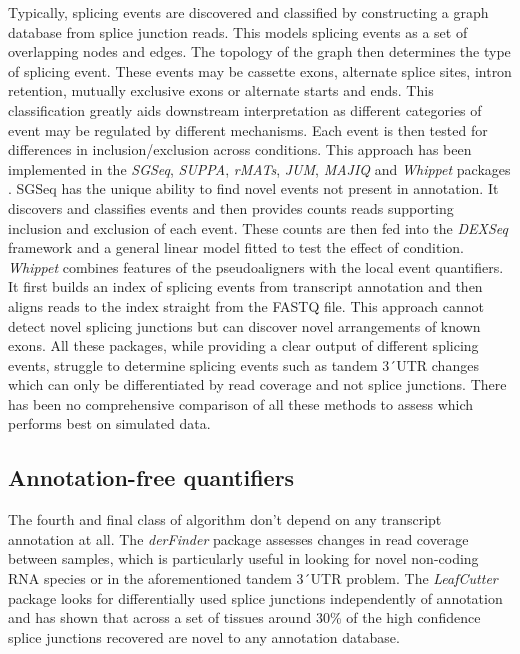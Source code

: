 Typically, splicing events are discovered and classified by constructing a graph database from splice junction reads.
This models splicing events as a set of overlapping nodes and edges. 
The topology of the graph then determines the type of splicing event.
These events may be cassette exons, alternate splice sites, intron retention, mutually exclusive exons or alternate starts and ends. 
This classification greatly aids downstream interpretation as different categories of event may be regulated by different mechanisms.
 Each event is then tested for differences in inclusion/exclusion across conditions. 
 This approach has been implemented in the \textit{SGSeq}, \textit{SUPPA}, \textit{rMATs}, \textit{JUM}, \textit{MAJIQ} and \textit{Whippet} packages \citep{Goldstein2016,Alamancos2015,Vaquero-Garcia2016,Wang2018a,Shen2014, Sterne-Weiler2018a}. 
SGSeq has the unique ability to find novel events not present in annotation. 
It discovers and classifies events and then provides counts reads supporting inclusion and exclusion of each event.
These counts are then fed into the \textit{DEXSeq} framework and a general linear model fitted to test the effect of condition. %
\textit{Whippet} combines features of the pseudoaligners with the local event quantifiers. 
It first builds an index of splicing events from transcript annotation and then aligns reads to the index straight from the FASTQ file. 
This approach cannot detect novel splicing junctions but can discover novel arrangements of known exons.
All these packages, while providing a clear output of different splicing events, struggle to determine splicing events such as tandem 3\'\ UTR changes which can only be differentiated by read coverage and not splice junctions.
There has been no comprehensive comparison of all these methods to assess which performs best on simulated data.

\subsection{Annotation-free quantifiers}
The fourth and final class of algorithm don't depend on any transcript annotation at all. The \textit{derFinder} package \citep{Collado-Torres2017} assesses changes in read coverage between samples, which is particularly useful in looking for novel non-coding RNA species or in the aforementioned tandem 3\'\ UTR problem. The \textit{LeafCutter} package \citep{Li2016} looks for differentially used splice junctions independently of annotation and has shown that across a set of tissues around 30\% of the high confidence splice junctions recovered are novel to any annotation database. 

